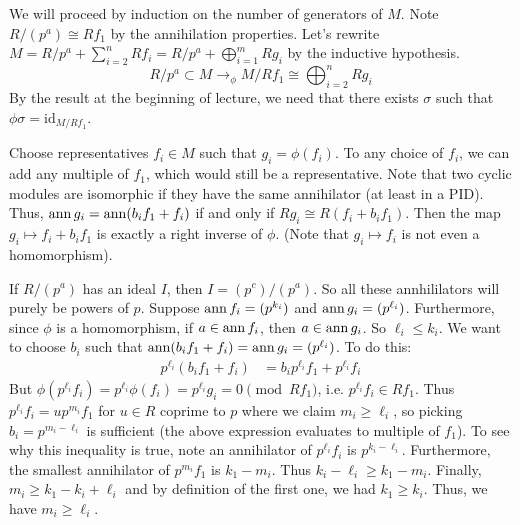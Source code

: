 We will proceed by induction on the number of generators of $M$.
Note $R/(p^a) \cong Rf_1$ by the annihilation properties.
Let's rewrite $M = R/p^a + \sum_{i = 2}^{n} R f_i = R/p^a + \bigoplus_{i = 1}^m Rg_i $ by the inductive hypothesis.
\[ R/p^a \subset M \to_{\phi} M/Rf_1 \cong \bigoplus_{i = 2}^n R g_i \]
By the result at the beginning of lecture, we need that there exists $ \sigma$ such that $\phi \sigma = \text{id}_{M/Rf_1}$.

Choose representatives $f_i \in M$ such that $g_i = \phi(f_i)$. To any choice of $f_i$, we can add any multiple of $f_1$, which
would still be a representative. Note that two cyclic modules
are isomorphic if they have the same annihilator (at least in a PID). Thus,
$\operatorname{ann} g_i = \operatorname{ann}(b_i f_1 + f_i)$ if and only if $Rg_i \cong R(f_i + b_i f_1)$.
Then the map $g_i \mapsto f_i + b_i f_1$ is exactly a right inverse of $\phi$. (Note that $g_i \mapsto f_i$ is not even
a homomorphism). 

If $R/(p^a)$ has an ideal $I$, then $I = (p^c) / (p^a)$. So all these annhililators will purely be powers of $p$.
Suppose $\operatorname{ann} f_i = (p^{k_i})$ and $\operatorname{ann} g_i = (p^{\ell_i})$. Furthermore, since $\phi$ is a homomorphism, if $a \in \operatorname{ann} f_i$, then $a \in \operatorname{ann} g_i$. So $\ell_i \le k_i$.
We want to choose $b_i$ such that $\operatorname{ann} (b_i f_1 + f_i) = \operatorname{ann} g_i = (p^{\ell_i})$.
To do this:
\begin{align*}
    p^{\ell_i} (b_i f_1 + f_i) &= b_i p^{\ell_i} f_1 + p^{\ell_i} f_i
\end{align*}
But $\phi(p^{\ell_i} f_i) = p^{\ell_i} \phi(f_i) = p^{\ell_i} g_i = 0 \pmod{Rf_1}$,
i.e. $p^{\ell_i} f_i \in R f_1$. Thus $p^{\ell_i} f_i = u p^{m_i} f_1$ for $u \in R$ coprime to $p$ where we claim $m_i \ge \ell_i$, so picking
$b_i = p^{m_i - \ell_i}$ is sufficient (the above expression evaluates to multiple of $f_1$). 
To see why this inequality is true, note an annihilator of $p^{\ell_i} f_i$ is $p^{k_i - \ell_i}$.
Furthermore, the smallest annihilator of $p^{m_i} f_1$ is $k_1 - m_i$. Thus $k_i - \ell_i \ge k_1 - m_i $. Finally,
$ m_i \ge k_1 - k_i + \ell_i$
and by definition of the first one, we had $k_1 \ge k_i$. Thus, we have $m_i \ge \ell_i$.